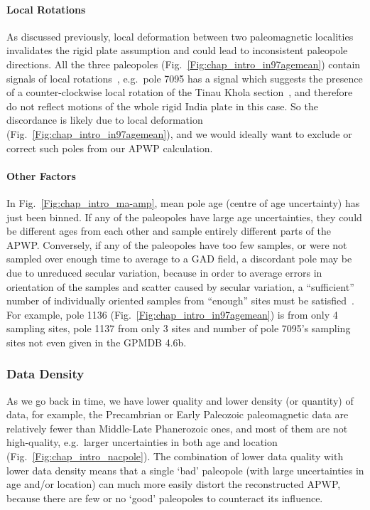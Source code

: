 \paragraph{Local Rotations}

As discussed previously, local deformation between two paleomagnetic localities
invalidates the rigid plate assumption and could lead to inconsistent paleopole
directions. All the three paleopoles (Fig.~\ref{Fig:chap_intro_in97agemean})
contain signals of local rotations~\citep{O82,G94}, e.g.\ pole 7095 has a signal
which suggests the presence of a counter-clockwise local rotation of the Tinau
Khola section~\citep{G94}, and therefore do not reflect motions of the whole
rigid India plate in this case. So the discordance is likely due to local
deformation (Fig.~\ref{Fig:chap_intro_in97agemean}), and we would ideally
want to exclude or correct such poles from our APWP calculation.

\paragraph{Other Factors}

In Fig.~\ref{Fig:chap_intro_ma-amp}, mean pole age (centre of age uncertainty)
has just been binned. If any of the paleopoles have large age uncertainties,
they could be different ages from each other and sample entirely different parts
of the APWP\@. Conversely, if any of the paleopoles have too few samples, or
were not sampled over enough time to average to a GAD field, a discordant pole
may be due to unreduced secular variation, because in order to average errors in
orientation of the samples and scatter caused by secular variation, a
``sufficient'' number of individually oriented samples from ``enough'' sites
must be satisfied~\citep{v90,B02,T20}. For example, pole 1136
(Fig.~\ref{Fig:chap_intro_in97agemean}) is from only 4 sampling sites, pole 1137
from only 3 sites and number of pole 7095's sampling sites not even given in the
GPMDB 4.6b.

\subsubsection{Data Density}\label{sec:datden}

As we go back in time, we have lower quality and lower density (or quantity) of
data, for example, the Precambrian or Early Paleozoic paleomagnetic data are
relatively fewer than Middle-Late Phanerozoic ones, and most of them are not
high-quality, e.g.\ larger uncertainties in both age and location
(Fig.~\ref{Fig:chap_intro_nacpole}). The combination of lower data quality with
lower data density means that a single `bad' paleopole (with large uncertainties
in age and/or location) can much more easily distort the reconstructed APWP,
because there are few or no `good' paleopoles to counteract its influence.

